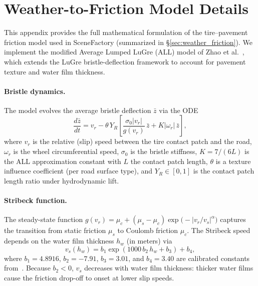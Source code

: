 \appendix

\section{Weather-to-Friction Model Details}
\label{app:friction_model}

This appendix provides the full mathematical formulation of the tire--pavement friction model used in SceneFactory (summarized in \S\ref{sec:weather_friction}).
We implement the modified Average Lumped LuGre (ALL) model of Zhao et al.~\cite{zhao_tire-pavement_2024}, which extends the LuGre bristle-deflection framework to account for pavement texture and water film thickness.

\paragraph{Bristle dynamics.}
The model evolves the average bristle deflection $\bar{z}$ via the ODE
\begin{equation}
\label{eq:app_bristle_ode}
\frac{d\bar{z}}{dt} = v_r - \theta \, Y_R \left[\frac{\sigma_0 \lvert v_r \rvert}{g(v_r)}\,\bar{z} + K \lvert \omega_r \rvert\,\bar{z}\right],
\end{equation}
where $v_r$ is the relative (slip) speed between the tire contact patch and the road, $\omega_r$ is the wheel circumferential speed, $\sigma_0$ is the bristle stiffness, $K = 7/(6L)$ is the ALL approximation constant with $L$ the contact patch length, $\theta$ is a texture influence coefficient (per road surface type), and $Y_R \in [0,1]$ is the contact patch length ratio under hydrodynamic lift.

\paragraph{Stribeck function.}
The steady-state function $g(v_r) = \mu_c + (\mu_s - \mu_c)\exp\bigl(-\lvert v_r / v_s \rvert^\alpha\bigr)$ captures the transition from static friction $\mu_s$ to Coulomb friction $\mu_c$.
The Stribeck speed depends on the water film thickness $h_w$ (in meters) via
\begin{equation}
\label{eq:app_stribeck_speed}
v_s(h_w) = b_1 \exp(1000\,b_2\,h_w + b_3) + b_4,
\end{equation}
where $b_1 = 4.8916$, $b_2 = -7.91$, $b_3 = 3.01$, and $b_4 = 3.40$ are calibrated constants from~\cite{zhao_tire-pavement_2024}.
Because $b_2 < 0$, $v_s$ decreases with water film thickness: thicker water films cause the friction drop-off to onset at lower slip speeds.

